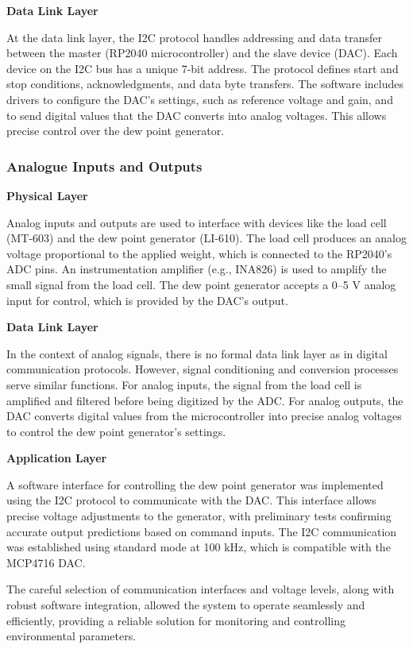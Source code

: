 \textbf{Data Link Layer}

At the data link layer, the I2C protocol handles addressing and data transfer between the master 
(RP2040 microcontroller) and the slave device (DAC). Each device on the I2C bus has a unique 7-bit address. 
The protocol defines start and stop conditions, acknowledgments, and data byte transfers. The software includes drivers to configure the DAC's settings, such as reference voltage and gain, and to send digital values that the DAC converts into analog voltages. This allows precise control over the dew point generator.

\subsubsection{Analogue Inputs and Outputs}

\textbf{Physical Layer}

Analog inputs and outputs are used to interface with devices like the load cell (MT-603) and the dew point 
generator (LI-610). The load cell produces an analog voltage proportional to the applied weight, which is 
connected to the RP2040's ADC pins. An instrumentation amplifier (e.g., INA826) is used to amplify the small 
signal from the load cell. The dew point generator accepts a 0–5 V analog input for control, which is 
provided by the DAC's output.

\textbf{Data Link Layer}

In the context of analog signals, there is no formal data link layer as in digital communication protocols. 
However, signal conditioning and conversion processes serve similar functions. For analog inputs, the signal 
from the load cell is amplified and filtered before being digitized by the ADC. For analog outputs, the DAC 
converts digital values from the microcontroller into precise analog voltages to control the dew point 
generator's settings.

\textbf{Application Layer}

A software interface for controlling the dew point generator was implemented 
using the I2C protocol to communicate with the DAC. This interface allows precise voltage adjustments to 
the generator, with preliminary tests confirming accurate output predictions based on command inputs. 
The I2C communication was established using standard mode at 100 kHz, which is compatible with the MCP4716 DAC.

The careful selection of communication interfaces and voltage levels, along with robust software 
integration, allowed the system to operate seamlessly and efficiently, providing a reliable solution 
for monitoring and controlling environmental parameters.

